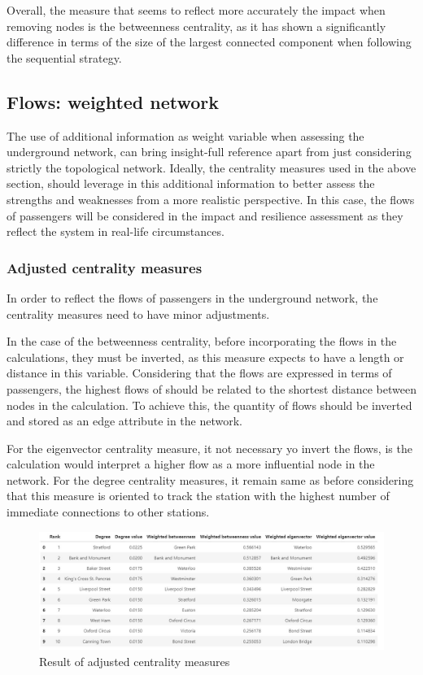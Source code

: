 \documentclass{article}
\begin{document}
Overall, the measure that seems to reflect more accurately the impact when removing nodes is the betweenness centrality, as it has shown a significantly difference in terms of the size of the largest connected component when following the sequential strategy.

\subsection{Flows: weighted network}

The use of additional information as weight variable when assessing the underground network, can bring insight-full reference apart from just considering strictly the topological network. Ideally, the centrality measures used in the above section, should leverage in this additional information to better assess the strengths and weaknesses from a more realistic perspective. In this case, the flows of passengers will be considered in the impact and resilience assessment as they reflect the system in real-life circumstances.

\subsubsection{Adjusted centrality measures}

In order to reflect the flows of passengers in the underground network, the centrality measures need to have minor adjustments.

In the case of the betweenness centrality, before incorporating the flows in the calculations, they must be inverted, as this measure expects to have a length or distance in this variable. Considering that the flows are expressed in terms of passengers, the highest flows of should be related to the shortest distance between nodes in the calculation. To achieve this, the quantity of flows should be inverted and stored as an edge attribute in the network.

For the eigenvector centrality measure, it not necessary yo invert the flows, is the calculation would interpret a higher flow as a more influential node in the network. For the degree centrality measures, it remain same as before considering that this measure is oriented to track the station with the highest number of immediate connections to other stations.

\begin{figure}[htp]
    \centering
    \includegraphics[width=15cm]{Weighted_Centrality_Results.jpg}
    \caption{Result of adjusted centrality measures}
    \label{fig:weighted_centrality_results}
\end{figure}
\end{document}
